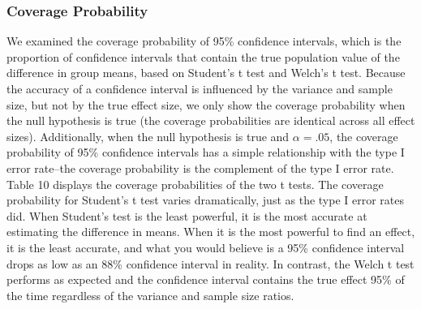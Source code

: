 \documentclass[man,a4paper,noextraspace,apacite]{apa6}
\begin{document}
\subsubsection{Coverage Probability}
We examined the coverage probability of 95\% confidence intervals, which is the proportion of confidence intervals that contain the true population value of the difference in group means, based on Student's t test and Welch's t test. Because the accuracy of a confidence interval is influenced by the variance and sample size, but not by the true effect size, we only show the coverage probability when the null hypothesis is true (the coverage probabilities are identical across all effect sizes). Additionally, when the null hypothesis is true and $\alpha = .05$, the coverage probability of 95\% confidence intervals has a simple relationship with the type I error rate--the coverage probability is the complement of the type I error rate. Table 10 displays the coverage probabilities of the two t tests. The coverage probability for Student's t test varies dramatically, just as the type I error rates did. When Student's test is the least powerful, it is the most accurate at estimating the difference in means. When it is the most powerful to find an effect, it is the least accurate, and what you would believe is a 95\% confidence interval drops as low as an 88\% confidence interval in reality. In contrast, the Welch t test performs as expected and the confidence interval contains the true effect 95\% of the time regardless of the variance and sample size ratios. 
\end{document}
